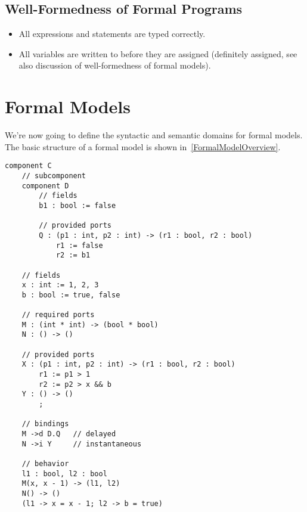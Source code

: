 \documentclass[a4paper,10pt,english]{article}
\begin{document}
\subsection{Well-Formedness of Formal Programs}
\begin{itemize}
	\item All expressions and statements are typed correctly.
	\item All variables are written to before they are assigned (definitely assigned, see also discussion of well-formedness of
	formal models).
\end{itemize}

\section{Formal Models}
We're now going to define the syntactic and semantic
domains for formal models. The basic structure of a formal model is shown in~\cref{FormalModelOverview}.

\begin{lstlisting}[tabsize=4,basicstyle=\footnotesize\ttfamily,label=FormalModelOverview,caption={Basic Structure of a
Formal Model},float=ht]
component C
	// subcomponent
	component D
		// fields
		b1 : bool := false
			
		// provided ports
		Q : (p1 : int, p2 : int) -> (r1 : bool, r2 : bool)
			r1 := false
			r2 := b1

	// fields
	x : int := 1, 2, 3
	b : bool := true, false
		
	// required ports
	M : (int * int) -> (bool * bool)
	N : () -> ()
		
	// provided ports
	X : (p1 : int, p2 : int) -> (r1 : bool, r2 : bool)
		r1 := p1 > 1
		r2 := p2 > x && b
	Y : () -> ()
		;
		
	// bindings
	M ->d D.Q   // delayed
	N ->i Y     // instantaneous
	
	// behavior
	l1 : bool, l2 : bool
	M(x, x - 1) -> (l1, l2)
	N() -> ()
	(l1 -> x = x - 1; l2 -> b = true)
\end{lstlisting}
\end{document}
